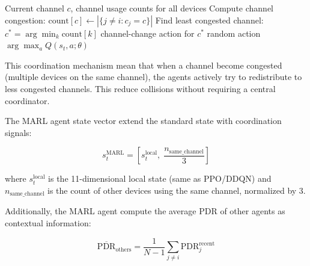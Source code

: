 \documentclass[12pt,a4paper]{article}
\begin{document}
\begin{algorithm}[H]
\caption{MARL Coordination-Aware Action Selection}
\label{alg:marl_action}
\begin{algorithmic}[1]
\Require Current channel $c$, channel usage counts for all devices
\State Compute channel congestion: $\text{count}[c] \gets |\{j \neq i : c_j = c\}|$
    \State Find least congested channel: $c^* = \arg\min_k \text{count}[k]$
    \State \Return channel-change action for $c^*$ 
\EndIf
{}
    \State \Return random action 
\Else
    \State \Return $\arg\max_a Q(s_t, a; \theta)$ 
\EndIf
\end{algorithmic}
\end{algorithm}

This coordination mechanism mean that when a channel become congested (multiple devices on the same channel), the agents actively try to redistribute to less congested channels. This reduce collisions without requiring a central coordinator.


The MARL agent state vector extend the standard state with coordination signals:

\begin{equation}
    s_t^{\text{MARL}} = \left[s_t^{\text{local}},\; \frac{n_{\text{same\_channel}}}{3}\right]
    \label{eq:marl_state}
\end{equation}

where $s_t^{\text{local}}$ is the 11-dimensional local state (same as PPO/DDQN) and $n_{\text{same\_channel}}$ is the count of other devices using the same channel, normalized by 3.

Additionally, the MARL agent compute the average PDR of other agents as contextual information:

\begin{equation}
    \overline{\text{PDR}}_{\text{others}} = \frac{1}{N-1} \sum_{j \neq i} \text{PDR}_j^{\text{recent}}
    \label{eq:avg_other_pdr}
\end{equation}
\end{document}
